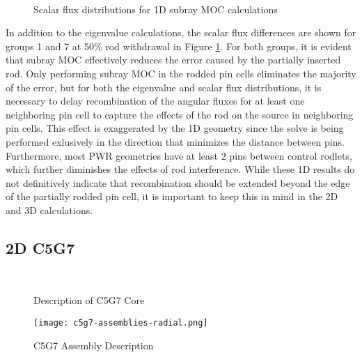 \begin{figure}[h]
    \centering
    ~
    \caption{Scalar flux distributions for 1D subray MOC calculations}\label{f:1d-subray-scalflux}
\end{figure}

In addition to the eigenvalue calculations, the scalar flux differences are shown for groups 1 and 7 at 50\% rod withdrawal in Figure \ref{f:1d-subray-scalflux}.  For both groups, it is evident that subray MOC effectively reduces the error caused by the partially inserted rod.  Only performing subray MOC in the rodded pin cells eliminates the majority of the error, but for both the eigenvalue and scalar flux distributions, it is necessary to delay recombination of the angular fluxes for at least one neighboring pin cell to capture the effects of the rod on the source in neighboring pin cells.  This effect is exaggerated by the 1D geometry since the solve is being performed exlusively in the direction that minimizes the distance between pins.  Furthermore, most PWR geometries have at least 2 pins between control rodlets, which further diminishes the effects of rod interference.  While these 1D results do not definitively indicate that recombination should be extended beyond the edge of the partially rodded pin cell, it is important to keep this in mind in the 2D and 3D calculations.

\subsection{2D C5G7}

\begin{figure}[h]
    \centering
    ~
    \caption{Description of C5G7 Core\cite{EELewisC5G7extended2005}}\label{f:c5g7-core}
\end{figure}

\begin{figure}[h]
    \centering
    \texttt{[image: c5g7-assemblies-radial.png]}
    \caption{C5G7 Assembly Description\cite{EELewisC5G7extended2005}}\label{f:c5g7-assemblies}
\end{figure}

